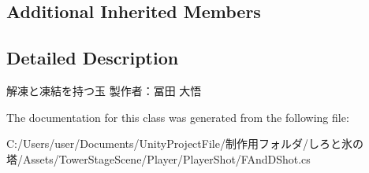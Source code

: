 \subsection*{Additional Inherited Members}


\subsection{Detailed Description}
解凍と凍結を持つ玉 製作者：冨田 大悟 



The documentation for this class was generated from the following file\+:\begin{DoxyCompactItemize}
\item 
C\+:/\+Users/user/\+Documents/\+Unity\+Project\+File/制作用フォルダ/しろと氷の塔/\+Assets/\+Tower\+Stage\+Scene/\+Player/\+Player\+Shot/F\+And\+D\+Shot.\+cs\end{DoxyCompactItemize}
